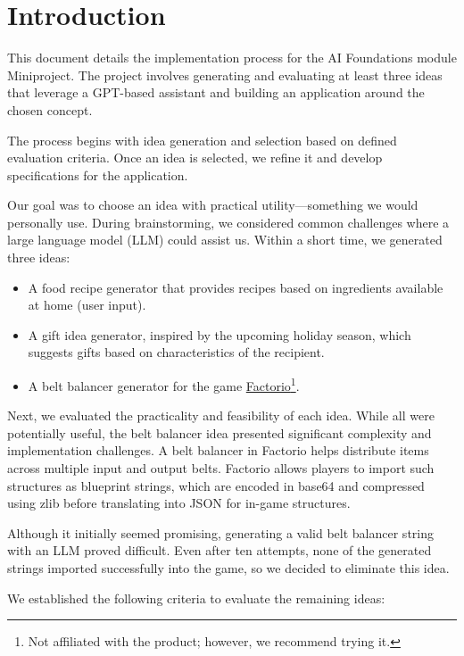 \chapter{Introduction}
\label{chapter:introduction}

This document details the implementation process for the AI Foundations module Miniproject. The project involves generating and evaluating at least three ideas that leverage a GPT-based assistant and building an application around the chosen concept.

The process begins with idea generation and selection based on defined evaluation criteria. Once an idea is selected, we refine it and develop specifications for the application.

Our goal was to choose an idea with practical utility—something we would personally use. During brainstorming, we considered common challenges where a large language model (LLM) could assist us. Within a short time, we generated three ideas:

\begin{itemize}
    \item A food recipe generator that provides recipes based on ingredients available at home (user input).
    \item A gift idea generator, inspired by the upcoming holiday season, which suggests gifts based on characteristics of the recipient.
    \item A belt balancer generator for the game \href{https://www.factorio.com}{Factorio}\footnote{Not affiliated with the product; however, we recommend trying it.}.
\end{itemize}

Next, we evaluated the practicality and feasibility of each idea. While all were potentially useful, the belt balancer idea presented significant complexity and implementation challenges. A belt balancer in Factorio helps distribute items across multiple input and output belts. Factorio allows players to import such structures as blueprint strings, which are encoded in base64 and compressed using zlib before translating into JSON for in-game structures.

Although it initially seemed promising, generating a valid belt balancer string with an LLM proved difficult. Even after ten attempts, none of the generated strings imported successfully into the game, so we decided to eliminate this idea.

We established the following criteria to evaluate the remaining ideas:

